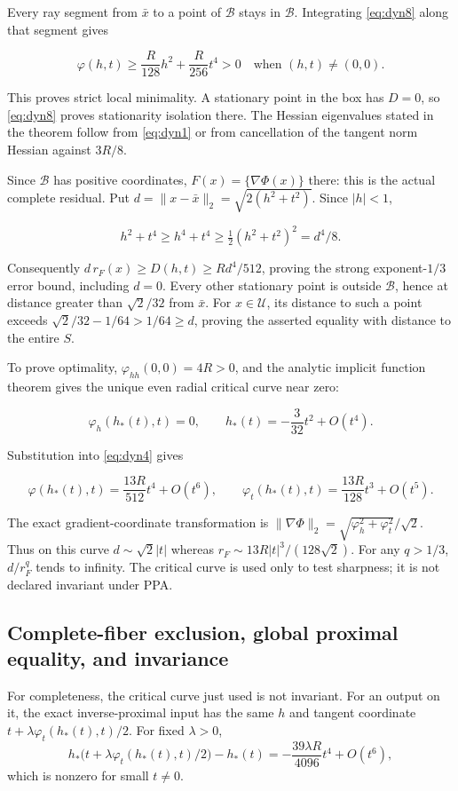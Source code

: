 \documentclass[11pt]{article}
\theoremstyle{remark}\newtheorem{remark}[theorem]{Remark}
\begin{document}
Every ray segment from \(\bar x\) to a point of \(\mathcal B\) stays in \(\mathcal B\). Integrating \eqref{eq:dyn8} along that segment gives

\[
\varphi(h,t)\ge \frac R{128}h^2+\frac R{256}t^4>0
\quad\text{when }(h,t)\ne(0,0).
\]

This proves strict local minimality. A stationary point in the box has \(D=0\), so \eqref{eq:dyn8} proves stationarity isolation there. The Hessian eigenvalues stated in the theorem follow from \eqref{eq:dyn1} or from cancellation of the tangent norm Hessian against \(3R/8\).

Since \(\mathcal B\) has positive coordinates, \(F(x)=\{\nabla\Phi(x)\}\) there: this is the actual complete residual. Put \(d=\|x-\bar x\|_2=\sqrt{2(h^2+t^2)}\). Since \(|h|<1\),

\[
h^2+t^4\ge h^4+t^4\ge\tfrac12(h^2+t^2)^2=d^4/8.
\]

Consequently \(d\,r_F(x)\ge D(h,t)\ge Rd^4/512\), proving the strong exponent-\(1/3\) error bound, including \(d=0\). Every other stationary point is outside \(\mathcal B\), hence at distance greater than \(\sqrt2/32\) from \(\bar x\). For \(x\in\mathcal U\), its distance to such a point exceeds \(\sqrt2/32-1/64>1/64\ge d\), proving the asserted equality with distance to the entire \(S\).

To prove optimality, \(\varphi_{hh}(0,0)=4R>0\), and the analytic implicit function theorem gives the unique even radial critical curve near zero:

\[
\varphi_h(h_*(t),t)=0,\qquad
h_*(t)=-\frac3{32}t^2+O(t^4).
\]

Substitution into \eqref{eq:dyn4} gives

\[
\varphi(h_*(t),t)=\frac{13R}{512}t^4+O(t^6),\qquad
\varphi_t(h_*(t),t)=\frac{13R}{128}t^3+O(t^5).
\]

The exact gradient-coordinate transformation is
\(\|\nabla\Phi\|_2=\sqrt{\varphi_h^2+\varphi_t^2}/\sqrt2\).
Thus on this curve \(d\sim\sqrt2|t|\) whereas
\(r_F\sim13R|t|^3/(128\sqrt2)\). For any \(q>1/3\), \(d/r_F^q\) tends to infinity. The critical curve is used only to test sharpness; it is not declared invariant under PPA.

\subsection{Complete-fiber exclusion, global proximal equality, and invariance}

For completeness, the critical curve just used is not invariant.
For an output on it, the exact inverse-proximal input has the same $h$
and tangent coordinate $t+\lambda\varphi_t(h_*(t),t)/2$. For fixed $\lambda>0$,
\[
 h_*\bigl(t+\lambda\varphi_t(h_*(t),t)/2\bigr)-h_*(t)
 =-\frac{39\lambda R}{4096}t^4+O(t^6),
\]
which is nonzero for small $t\ne0$.
\end{document}
